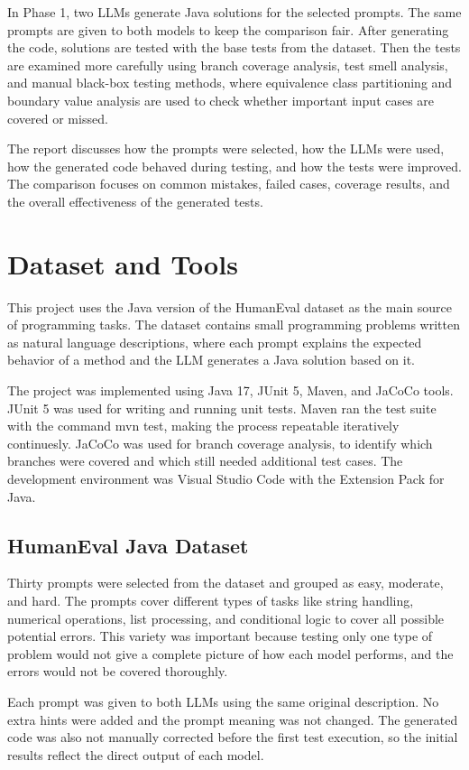 \documentclass[journal]{IEEEtran}
\begin{document}
In Phase 1, two LLMs generate Java solutions for the selected prompts. The same prompts are given to both models to keep the comparison fair. After generating the code, solutions are tested with the base tests from the dataset. Then the tests are examined more carefully using branch coverage analysis, test smell analysis, and manual black-box testing methods, where equivalence class partitioning and boundary value analysis are used to check whether important input cases are covered or missed.

The report discusses how the prompts were selected, how the LLMs were used, how the generated code behaved during testing, and how the tests were improved. The comparison focuses on common mistakes, failed cases, coverage results, and the overall effectiveness of the generated tests.


\section{Dataset and Tools}
This project uses the Java version of the HumanEval dataset as the main source of programming tasks. The dataset contains small programming problems written as natural language descriptions, where each prompt explains the expected behavior of a method and the LLM generates a Java solution based on it. 

The project was implemented using Java 17, JUnit 5, Maven, and JaCoCo tools. JUnit 5 was used for writing and running unit tests. Maven ran the test suite with the command mvn test, making the process repeatable iteratively continuesly. JaCoCo was used for branch coverage analysis, to identify which branches were covered and which still needed additional test cases. The development environment was Visual Studio Code with the Extension Pack for Java.

\subsection{HumanEval Java Dataset}
Thirty prompts were selected from the dataset and grouped as easy, moderate, and hard. The prompts cover different types of tasks like string handling, numerical operations, list processing, and conditional logic to cover all possible potential errors. This variety was important because testing only one type of problem would not give a complete picture of how each model performs, and the errors would not be covered thoroughly.

Each prompt was given to both LLMs using the same original description. No extra hints were added and the prompt meaning was not changed. The generated code was also not manually corrected before the first test execution, so the initial results reflect the direct output of each model.
\end{document}
